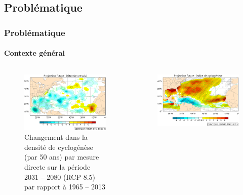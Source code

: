 \documentclass[aspectratio=169, usepdftitle=false, xcolor={dvipsnames}, 9pt,table]{beamer}
\begin{document}
\subsection{Problématique}
\begin{frame}[t]
    \frametitle{Problématique}
    \framesubtitle{Contexte général}
    \vspace{-1em}
    \begin{columns}[b]
        \begin{column}{0.5\textwidth}
            \begin{figure}[h]
                \centering
                \includegraphics[width=\textwidth]{Figures/density_fitted_title2.png}
                \caption{Changement dans la densité de cyclogénèse (par 50 ans) par mesure \alert{directe} sur la période 2031 -- 2080 (RCP 8.5) par rapport à 1965 -- 2013
                \parencite{chauvin_future_2020}}
            \end{figure}
        \end{column}
        \begin{column}{0.5\textwidth}
            \begin{figure}[h]
                \centering
                \includegraphics[width=\textwidth]{Figures/gpi_fitted_2_good_title2.png}

\end{figure}
\end{column}
\end{columns}
\end{frame}
\end{document}
